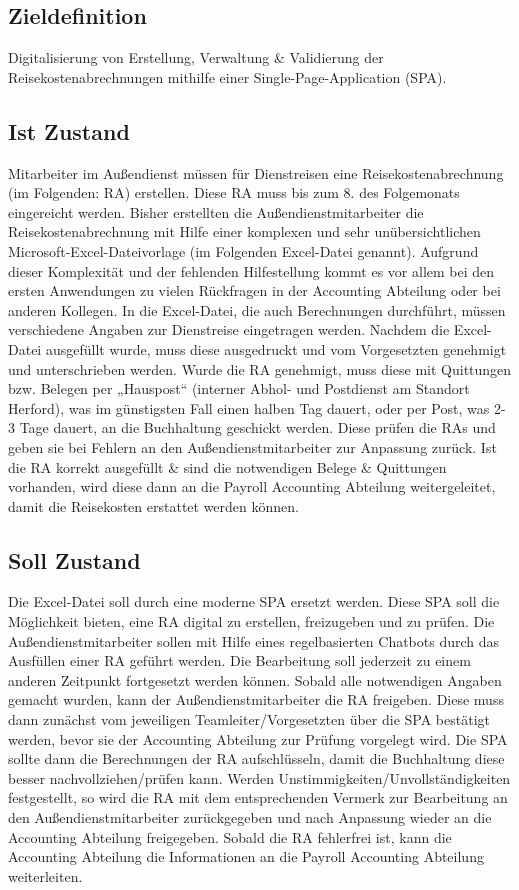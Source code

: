 \subsection{Zieldefinition}
Digitalisierung von Erstellung, Verwaltung & Validierung der Reisekostenabrechnungen mithilfe einer Single-Page-Application (SPA).

\subsection{Ist Zustand}
Mitarbeiter im Außendienst müssen für Dienstreisen eine Reisekostenabrechnung (im Folgenden: RA) erstellen. Diese RA muss bis zum 8. des Folgemonats eingereicht werden. Bisher erstellten die Außendienstmitarbeiter die Reisekostenabrechnung mit Hilfe einer komplexen und sehr unübersichtlichen Microsoft-Excel-Dateivorlage (im Folgenden Excel-Datei genannt). Aufgrund dieser Komplexität und der fehlenden Hilfestellung kommt es vor allem bei den ersten Anwendungen zu vielen Rückfragen in der Accounting Abteilung oder bei anderen Kollegen. In die Excel-Datei, die auch Berechnungen durchführt, müssen verschiedene Angaben zur Dienstreise eingetragen werden. Nachdem die Excel-Datei ausgefüllt wurde, muss diese ausgedruckt und vom Vorgesetzten genehmigt und unterschrieben werden. Wurde die RA genehmigt, muss diese mit Quittungen bzw. Belegen per „Hauspost“ (interner Abhol- und Postdienst am Standort Herford), was im günstigsten Fall einen halben Tag dauert, oder per Post, was 2-3 Tage dauert, an die Buchhaltung geschickt werden.
Diese prüfen die RAs und geben sie bei Fehlern an den Außendienstmitarbeiter zur Anpassung zurück. Ist die RA korrekt ausgefüllt & sind die notwendigen Belege & Quittungen vorhanden, wird diese dann an die Payroll Accounting Abteilung weitergeleitet, damit die Reisekosten erstattet werden können.

\subsection{Soll Zustand}
Die Excel-Datei soll durch eine moderne SPA ersetzt werden. Diese SPA soll die Möglichkeit bieten, eine RA digital zu erstellen, freizugeben und zu prüfen. Die Außendienstmitarbeiter sollen mit Hilfe eines regelbasierten Chatbots durch das Ausfüllen einer RA geführt werden. Die Bearbeitung soll jederzeit zu einem anderen Zeitpunkt fortgesetzt werden können. Sobald alle notwendigen Angaben gemacht wurden, kann der Außendienstmitarbeiter die RA freigeben. Diese muss dann zunächst vom jeweiligen Teamleiter/Vorgesetzten über die SPA bestätigt werden, bevor sie der Accounting Abteilung zur Prüfung vorgelegt wird. Die SPA sollte dann die Berechnungen der RA aufschlüsseln, damit die Buchhaltung diese besser nachvollziehen/prüfen kann. Werden Unstimmigkeiten/Unvollständigkeiten festgestellt, so wird die RA mit dem entsprechenden Vermerk zur Bearbeitung an den Außendienstmitarbeiter zurückgegeben und nach Anpassung wieder an die Accounting Abteilung freigegeben. Sobald die RA fehlerfrei ist, kann die Accounting Abteilung die Informationen an die Payroll Accounting Abteilung weiterleiten. 

